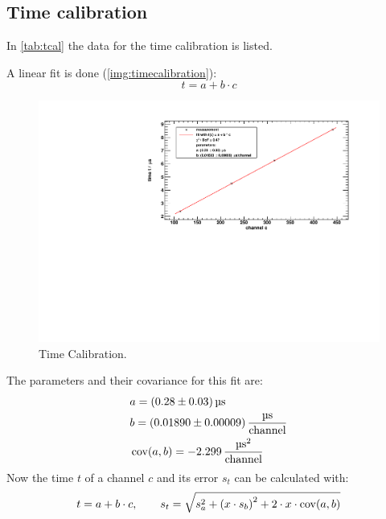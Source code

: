 \subsection{Time calibration}
In \autoref{tab:tcal} the data for the time calibration is listed.

A linear fit is done (\autoref{img:timecalibration}):
\begin{equation}
    t = a + b \cdot c
\end{equation}
\begin{figure}[H]
\begin{center}
  \includegraphics[width=\textwidth]{../img/timeCalibration.pdf}
  \caption{Time Calibration.}
  \label{img:timecalibration}
\end{center}
\end{figure}
The parameters and their covariance for this fit are:
\begin{equation}
    \begin{split}
        & a = (0.28 \pm 0.03) \, \text{\textmu s} \\
        & b = (0.01890 \pm 0.00009) \, \frac{\text{\textmu s}}{\text{channel}} \\
        & \cov(a, b) = -2.299 \, \frac{\text{\textmu s}^2}{\text{channel}} 
    \end{split}
\end{equation}
Now the time $t$ of a channel $c$ and its error $s_t$ can be calculated with:
\begin{equation}
\label{eq:tcalibration}
    t = a + b \cdot c, \qquad s_t = \sqrt{s_a^2 + \left(x \cdot s_b \right)^2 + 2 \cdot x \cdot \operatorname{cov}(a,b)}
\end{equation}

